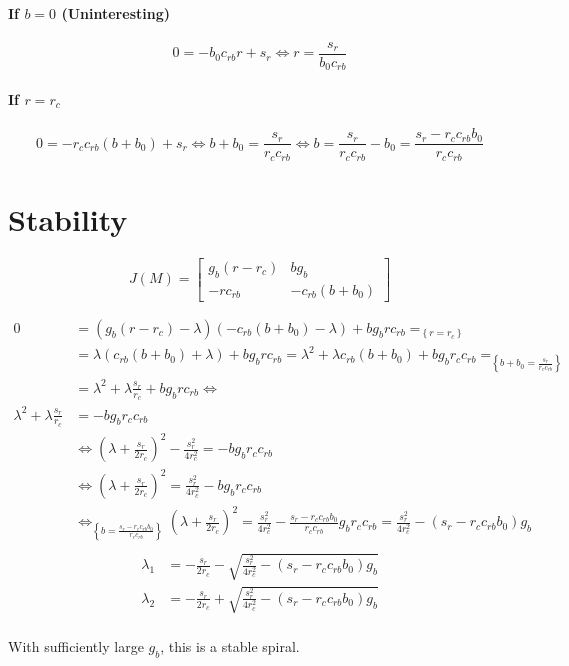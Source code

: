 \documentclass[a4paper, 12pt]{scrartcl}
\begin{document}
\paragraph{If $b = 0$ (Uninteresting)}
\[
 0 = -b_0c_{rb}r + s_r \Leftrightarrow r = \frac{s_r}{b_0 c_{rb}}
\]

\paragraph{If $r = r_c$}
\[
 0 = -r_c c_{rb}\left(b + b_0\right) + s_r \Leftrightarrow b + b_0 = \frac{s_r}{r_c c_{rb}} \Leftrightarrow b =
 \frac{s_r}{r_c c_{rb}} - b_0 =  \frac{s_r - r_c c_{rb}b_0}{r_c c_{rb}}
\]

\section{Stability}
\begin{equation}
J(M) =
 \begin{bmatrix}
 g_b\left(r - r_c\right) & bg_b\\
 -rc_{rb} & -c_{rb}\left(b + b_0\right)
 \end{bmatrix}
\end{equation}

\[
\begin{aligned}
0 &= \left(g_b\left(r - r_c\right) - \lambda\right)\left(-c_{rb}\left(b + b_0\right) - \lambda\right) +bg_b r c_{rb} =_{\left\{r = r_c\right\}}\\
  &= \lambda\left(c_{rb}\left(b + b_0\right) + \lambda\right) +bg_b r c_{rb} = \lambda^2 + \lambda c_{rb}\left(b + b_0\right) + bg_b r_c c_{rb} =_{\left\{b + b_0 = \frac{s_r}{r_c c_{rb}}\right\}}\\
  &= \lambda^2 + \lambda \frac{s_r}{r_c} + bg_b r c_{rb} \Leftrightarrow \\
\lambda^2 + \lambda \frac{s_r}{r_c} &= -bg_b r_c c_{rb} \\
&\Leftrightarrow \left(\lambda + \frac{s_r}{2r_c}\right)^2 - \frac{s_r^2}{4r_c^2} = -bg_b r_c c_{rb}\\
&\Leftrightarrow \left(\lambda + \frac{s_r}{2r_c}\right)^2  = \frac{s_r^2}{4r_c^2} -bg_b r_c c_{rb}\\
&\Leftrightarrow_{\left\{b = \frac{s_r - r_c c_{rb}b_0}{r_c c_{rb}}\right\}} \left(\lambda + \frac{s_r}{2r_c}\right)^2  = \frac{s_r^2}{4r_c^2} -\frac{s_r - r_c c_{rb}b_0}{r_c c_{rb}}g_b r_c c_{rb} = \frac{s_r^2}{4r_c^2} -\left(s_r - r_c c_{rb}b_0\right)g_b \\
\end{aligned}
\]
\[
\begin{aligned}
 \lambda_1 &= -\frac{s_r}{2r_c}-\sqrt{\frac{s_r^2}{4r_c^2} - \left(s_r - r_c c_{rb}b_0\right)g_b} \\
 \lambda_2 &= -\frac{s_r}{2r_c}+\sqrt{\frac{s_r^2}{4r_c^2} - \left(s_r - r_c c_{rb}b_0\right)g_b} \\
\end{aligned}
\]

With sufficiently large $g_b$, this is a stable spiral.
\end{document}
